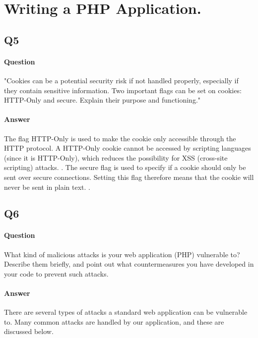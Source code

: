 \documentclass[11pt, a4paper]{article}
\begin{document}
\section{Writing a PHP Application.}
\subsection{Q5}
\paragraph{Question}
"Cookies can be a potential security risk if not handled properly, especially if they contain
sensitive information. Two important flags can be set on cookies: HTTP-Only and secure.
Explain their purpose and functioning."
\paragraph{Answer}
The flag HTTP-Only is used to make the cookie only accessible through the HTTP protocol. A HTTP-Only cookie cannot be accessed by scripting languages (since it is HTTP-Only), which reduces the possibility for XSS (cross-site scripting) attacks. \cite{cookie-http}.
The secure flag is used to specify if a cookie should only be sent over secure connections. Setting this flag therefore means that the cookie will never be sent in plain text. \cite{cookie-secure}.
\subsection{Q6}
\paragraph{Question}
What kind of malicious attacks is your web application (PHP) vulnerable to? Describe
them briefly, and point out what countermeasures you have developed in your code to prevent
such attacks.
\paragraph{Answer}
There are several types of attacks a standard web application can be vulnerable to. Many common attacks are handled by our application, and these are discussed below.
\end{document}
